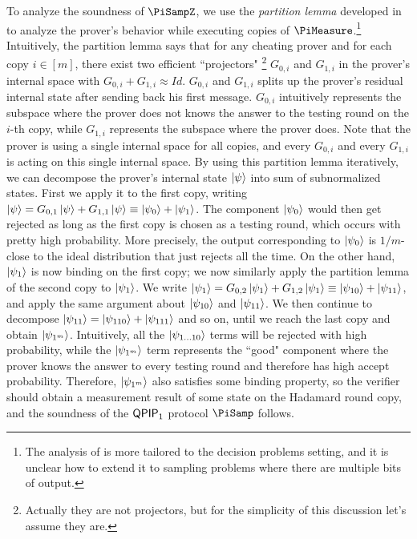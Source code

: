 To analyze the soundness of $\PiSampZ$, we use the \emph{partition lemma} developed in~\cite{arXiv:ChiaChungYam19} to analyze the prover's behavior while executing copies of $\PiMeasure$.\footnote{The analysis of \cite{arXiv:AlaChiHun19} is more tailored to the decision problems setting, and it is unclear how to extend it to sampling problems where there are multiple bits of output.} Intuitively, the partition lemma says that for any cheating prover and for each copy $i\in[m]$, there exist two efficient ``projectors" \footnote{Actually they are not projectors, but for the simplicity of this discussion let's assume they are.} $G_{0,i}$ and $G_{1,i}$ in the prover's internal space with $G_{0,i}+G_{1,i} \approx Id$. $G_{0,i}$ and $G_{1,i}$ splits up the prover's residual internal state after sending back his first message.
$G_{0,i}$ intuitively represents the subspace where the prover does not knows the answer to the testing round on the $i$-th copy, while $G_{1,i}$ represents the subspace where the prover does. Note that the prover is using a single internal space for all copies, and every $G_{0,i}$ and every $G_{1,i}$ is acting on this single internal space. 
By using this partition lemma iteratively, we can decompose the prover's internal state $\ket{\psi}$ into sum of subnormalized states.
First we apply it to the first copy, writing $\ket{\psi}=G_{0,1}\ket{\psi}+G_{1,1}\ket{\psi} \equiv \ket{\psi_0}+\ket{\psi_1}$.
The component $\ket{\psi_0}$ would then get rejected as long as the first copy is chosen as a testing round,
which occurs with pretty high probability.
More precisely, the output corresponding to $\ket{\psi_0}$ is $1/m$-close to the ideal distribution that just rejects all the time.
On the other hand, $\ket{\psi_1}$ is now binding on the first copy;
we now similarly apply the partition lemma of the second copy to $\ket{\psi_1}$.
We write $\ket{\psi_1}=G_{0,2}\ket{\psi_1}+G_{1,2}\ket{\psi_1}\equiv \ket{\psi_{10}}+\ket{\psi_{11}}$, and apply the same argument about $\ket{\psi_{10}}$ and $\ket{\psi_{11}}$.
We then continue to decompose $\ket{\psi_{11}}=\ket{\psi_{110}}+\ket{\psi_{111}}$ and so on, until we reach the last copy and obtain $\ket{\psi_{1^m}}$.
Intuitively, all the $\ket{\psi_{1\dots10}}$ terms will be rejected with high probability, while the $\ket{\psi_{1^m}}$ term represents the ``good" component where the prover knows the answer to every testing round and therefore has high accept probability. Therefore, $\ket{\psi_{1^m}}$ also satisfies some binding property,
so the verifier should obtain a measurement result of some state on the Hadamard round copy,
and the soundness of the $\operatorname{\mathsf{QPIP}}_1$ protocol $\PiSamp$ follows.

